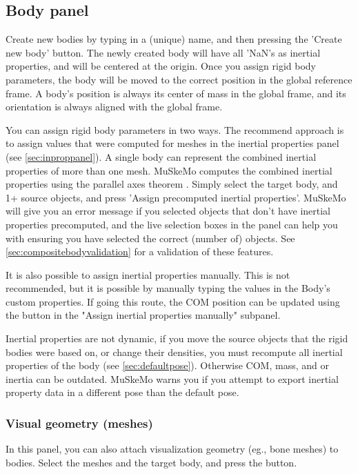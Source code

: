 \documentclass{article}
\begin{document}
\subsection{Body panel}
\label{sec:bodypanel}

Create new bodies by typing in a (unique) name, and then pressing the 'Create new body' button. The newly created body will have all 'NaN's as inertial properties, and will be centered at the origin. Once you assign rigid body parameters, the body will be moved to the correct position in the global reference frame. A body's position is always its center of mass in the global frame, and its orientation is always aligned with the global frame.

You can assign rigid body parameters in two ways. The recommend approach is to assign values that were computed for meshes in the inertial properties panel (see \ref{sec:inproppanel}). A single body can represent the combined inertial properties of more than one mesh. MuSkeMo computes the combined inertial properties using the parallel axes theorem \cite{valleryAdvancedDynamics2019,ruinaMechanicsToolsetStatics2019}. Simply select the target body, and 1+ source objects, and press 'Assign precomputed inertial properties'. MuSkeMo will give you an error message if you selected objects that don't have inertial properties precomputed, and the live selection boxes in the panel can help you with ensuring you have selected the correct (number of) objects. See \ref{sec:compositebodyvalidation} for a validation of these features.

It is also possible to assign inertial properties manually. This is not recommended, but it is possible by manually typing the values in the Body's custom properties. If going this route, the COM position can be updated using the button in the "Assign inertial properties manually" subpanel.


Inertial properties are not dynamic, if you move the source objects that the rigid bodies were based on, or change their densities, you must recompute all inertial properties of the body (see \ref{sec:defaultpose}). Otherwise COM, mass, and or inertia can be outdated. MuSkeMo warns you if you attempt to export inertial property data in a different pose than the default pose.

\subsubsection{Visual geometry (meshes)}
\label{sec:visgeomsubpanel}
In this panel, you can also attach visualization geometry (eg., bone meshes) to bodies. Select the meshes and the target body, and press the button.
\end{document}

